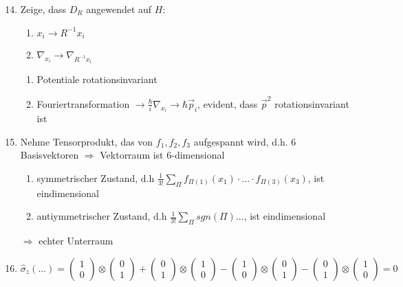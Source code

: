 \documentclass[twoside,a4paper]{scrartcl}
\renewcommand{\1}{\mathds{1}}
\newcommand{\Ra}{\Rightarrow}
\newcommand{\ra}{\rightarrow}
\begin{document}
\begin{enumerate}
\setcounter{enumi}{13}
\item Zeige, dass $D_R$ angewendet auf $H$:\\
	\begin{enumerate}
	\item $x_i \ra R^{-1}x_i$
	\item $\nabla_{x_i} \ra  \nabla_{R^{-1}x_i}$
	\end{enumerate}
	\begin{enumerate}
	\item Potentiale rotationsinvariant
	\item Fouriertransformation $\ra \frac{\hbar}{i}\nabla_{x_i} \ra \hbar \vec p_i$, evident, dass $\vec p^2$ rotationsinvariant ist
	\end{enumerate}
\item Nehme Tensorprodukt, das von $f_1,f_2,f_3$ aufgespannt wird, d.h. 6 Basisvektoren $\Ra$ Vektorraum ist 6-dimensional
\begin{enumerate}
\item symmetrischer Zustand, d.h $\frac{1}{3!} \sum_\Pi f_{\Pi(1)}(x_1)\cdot ... \cdot f_{\Pi(3)}(x_3)$, ist eindimensional
\item antiymmetrischer Zustand, d.h $\frac{1}{3!} \sum_\Pi sgn(\Pi) ...$, ist eindimensional
\end{enumerate}
$\Ra$ echter Unterraum
\item $$\hat \sigma_z(...)=\begin{pmatrix} 1 \\0 \end{pmatrix} \otimes \begin{pmatrix} 0 \\1 \end{pmatrix}+\begin{pmatrix} 0 \\1 \end{pmatrix}\otimes \begin{pmatrix} 1 \\0 \end{pmatrix}-\begin{pmatrix} 1 \\0 \end{pmatrix} \otimes \begin{pmatrix} 0 \\1 \end{pmatrix}-\begin{pmatrix} 0 \\1 \end{pmatrix}\otimes \begin{pmatrix} 1 \\0 \end{pmatrix}=0$$
\end{enumerate}
\end{document}

